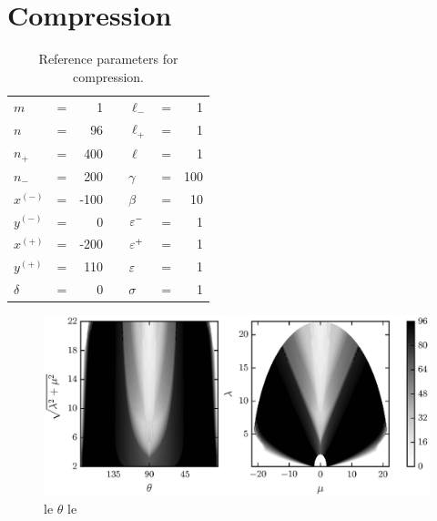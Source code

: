 \section{Compression}

	\begin{table}
		\centering
		\caption{Reference parameters for compression. \label{table:compression_reference}}
		\begin{tabular}{lcrclcr}
			$m$ & = & 1 & \hspace{1in} & $\ell_-$ & = & 1 \\
			$n$ & = & 96 & & $\ell_+$ & = & 1 \\
			$n_+$ & = & 400 & & $\ell$ & = & 1 \\
			$n_-$ & = & 200 & & $\gamma$ & = & 100 \\
			$x^{(-)}$ & = & -100 & & $\beta$ & = & 10 \\
			$y^{(-)}$ & = & 0 & & $\varepsilon^-$ & = & 1 \\
			$x^{(+)}$ & = & -200 & & $\varepsilon^+$ & = & 1 \\
			$y^{(+)}$ & = & 110 & & $\varepsilon$ & = & 1 \\
			$\delta$ & = & 0 & & $\sigma$ & = & 1
		\end{tabular}
	\end{table}

	\begin{figure}
		\begin{center}
			\includegraphics{./fig/ch3/push/ref/grid.eps}
		\end{center}		
		\caption{ le $\theta$ le
		\label{fig:PushGrid:vanilla}}
	\end{figure}	
	
